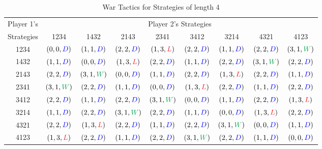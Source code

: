 \documentclass[11pt]{article}
\begin{document}
\begin{table}[h]
    \centering
    \begin{tabular}{ccccccccc}
  Player 1's& \multicolumn{8}{c}{Player 2's Strategies}\\
          Strategies&  1234&  1432&  2143&  2341&  3412&  3214&  4321& 4123\\
1234& $( 0 , 0 , \textcolor{blue}{D})$
& $( 1 , 1 , \textcolor{blue}{D})$
& $( 2 , 2 , \textcolor{blue}{D})$
& $( 1 , 3 , \textcolor{Red}{L})$
& $( 2 , 2 , \textcolor{blue}{D})$
& $( 1 , 1 , \textcolor{blue}{D})$
& $( 2 , 2 , \textcolor{blue}{D})$
& $( 3 , 1 , \textcolor{Green}{W})$
\\
          1432& $( 1 , 1 , \textcolor{blue}{D})$
& $( 0 , 0 , \textcolor{blue}{D})$
& $( 1 , 3 , \textcolor{Red}{L})$
& $( 2 , 2 , \textcolor{blue}{D})$
& $( 1 , 1 , \textcolor{blue}{D})$
& $( 2 , 2 , \textcolor{blue}{D})$
& $( 3 , 1 , \textcolor{Green}{W})$
& $( 2 , 2 , \textcolor{blue}{D})$
\\
          2143& $( 2 , 2 , \textcolor{blue}{D})$
& $( 3 , 1 , \textcolor{Green}{W})$
& $( 0 , 0 , \textcolor{blue}{D})$
& $( 1 , 1 , \textcolor{blue}{D})$
& $( 2 , 2 , \textcolor{blue}{D})$
& $( 1 , 3 , \textcolor{Red}{L})$
& $( 2 , 2 , \textcolor{blue}{D})$
& $( 1 , 1 , \textcolor{blue}{D})$
\\
          2341& $( 3 , 1 , \textcolor{Green}{W})$
& $( 2 , 2 , \textcolor{blue}{D})$
& $( 1 , 1 , \textcolor{blue}{D})$
& $( 0 , 0 , \textcolor{blue}{D})$
& $( 1 , 3 , \textcolor{Red}{L})$
& $( 2 , 2 , \textcolor{blue}{D})$
& $( 1 , 1 , \textcolor{blue}{D})$
& $( 2 , 2 , \textcolor{blue}{D})$
\\
          3412& $( 2 , 2 , \textcolor{blue}{D})$
& $( 1 , 1 , \textcolor{blue}{D})$
& $( 2 , 2 , \textcolor{blue}{D})$
& $( 3 , 1 , \textcolor{Green}{W})$
& $( 0 , 0 , \textcolor{blue}{D})$
& $( 1 , 1 , \textcolor{blue}{D})$
& $( 2 , 2 , \textcolor{blue}{D})$
& $( 1 , 3 , \textcolor{Red}{L})$
\\
          3214& $( 1 , 1 , \textcolor{blue}{D})$
& $( 2 , 2 , \textcolor{blue}{D})$
& $( 3 , 1 , \textcolor{Green}{W})$
& $( 2 , 2 , \textcolor{blue}{D})$
& $( 1 , 1 , \textcolor{blue}{D})$
& $( 0 , 0 , \textcolor{blue}{D})$
& $( 1 , 3 , \textcolor{Red}{L})$
& $( 2 , 2 , \textcolor{blue}{D})$
\\
          4321& $( 2 , 2 , \textcolor{blue}{D})$
& $( 1 , 3 , \textcolor{Red}{L})$
& $( 2 , 2 , \textcolor{blue}{D})$
& $( 1 , 1 , \textcolor{blue}{D})$
& $( 2 , 2 , \textcolor{blue}{D})$
& $( 3 , 1 , \textcolor{Green}{W})$
& $( 0 , 0 , \textcolor{blue}{D})$
& $( 1 , 1 , \textcolor{blue}{D})$
\\
          4123& $( 1 , 3 , \textcolor{Red}{L})$
& $( 2 , 2 , \textcolor{blue}{D})$
& $( 1 , 1 , \textcolor{blue}{D})$
& $( 2 , 2 , \textcolor{blue}{D})$
& $( 3 , 1 , \textcolor{Green}{W})$
& $( 2 , 2 , \textcolor{blue}{D})$
& $( 1 , 1 , \textcolor{blue}{D})$
& $( 0 , 0 , \textcolor{blue}{D})$
\\
    \end{tabular}
    \caption{War Tactics for Strategies of length 4}
    \label{tab:my_label}
\end{table}
\end{document}
